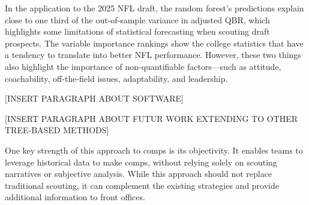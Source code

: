 \documentclass[Review, sageh, times]{sagej}
\begin{document}
In the application to the 2025 NFL draft, the random forest's predictions explain close to one third of the out-of-sample variance in adjusted QBR, which highlights some limitations of statistical forecasting when scouting draft prospects. The variable importance rankings show the college statistics that have a tendency to translate into better NFL performance. However, these two things also highlight the importance of non-quantifiable factors---such as attitude, coachability, off-the-field issues, adaptability, and leadership.

[INSERT PARAGRAPH ABOUT SOFTWARE]

[INSERT PARAGRAPH ABOUT FUTUR WORK EXTENDING TO OTHER TREE-BASED METHODS]

One key strength of this approach to comps is its objectivity. It enables teams to leverage historical data to make comps, without relying solely on scouting narratives or subjective analysis. While this approach should not replace traditional scouting, it can complement the existing strategies and provide additional information to front offices. 

\printbibliography
\end{document}
